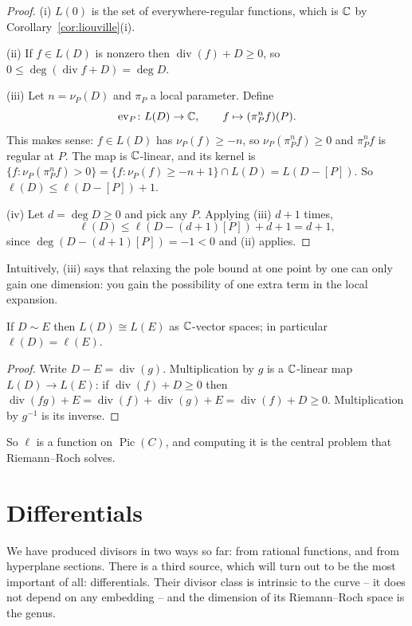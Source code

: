 \documentclass[a4paper]{scrartcl}
\DeclareMathOperator{\Divv}{div}
\DeclareMathOperator{\Pic}{Pic}
\begin{document}
\begin{proof}
	(i) $L(0)$ is the set of everywhere-regular functions, which is $\mathbb{C}$ by Corollary~\ref{cor:liouville}(i).

	(ii) If $f \in L(D)$ is nonzero then $\Divv(f) + D \geq 0$, so $0 \leq \deg(\Divv f + D) = \deg D$.

	(iii) Let $n = \nu_P(D)$ and $\pi_P$ a local parameter. Define
	$$\mathrm{ev}_P \colon L(D) \to \mathbb{C}, \qquad f \mapsto (\pi_P^{n}f)(P).$$
	This makes sense: $f \in L(D)$ has $\nu_P(f)\geq -n$, so $\nu_P(\pi_P^nf)\geq 0$ and $\pi_P^nf$ is regular at $P$. The map is $\mathbb{C}$-linear, and its kernel is $\{f : \nu_P(\pi_P^nf) > 0\} = \{f : \nu_P(f) \geq -n+1\} \cap L(D) = L(D - [P])$. So $\ell(D) \leq \ell(D-[P]) + 1$.

	(iv) Let $d = \deg D \geq 0$ and pick any $P$. Applying (iii) $d+1$ times,
	$$\ell(D) \leq \ell(D - (d+1)[P]) + d + 1 = d+1,$$
	since $\deg(D - (d+1)[P]) = -1 < 0$ and (ii) applies.
\end{proof}

Intuitively, (iii) says that relaxing the pole bound at one point by one can only gain one dimension: you gain the possibility of one extra term in the local expansion.

\begin{proposition}\label{prop:Lsim}
	If $D \sim E$ then $L(D)\cong L(E)$ as $\mathbb{C}$-vector spaces; in particular $\ell(D) = \ell(E)$.
\end{proposition}

\begin{proof}
	Write $D - E = \Divv(g)$. Multiplication by $g$ is a $\mathbb{C}$-linear map $L(D)\to L(E)$: if $\Divv(f)+D\geq0$ then $\Divv(fg) + E = \Divv(f) + \Divv(g) + E = \Divv(f)+D \geq 0$. Multiplication by $g^{-1}$ is its inverse.
\end{proof}

So $\ell$ is a function on $\Pic(C)$, and computing it is the central problem that Riemann--Roch solves.

\section{Differentials}\label{ag-sec:differentials}

We have produced divisors in two ways so far: from rational functions, and from hyperplane sections. There is a third source, which will turn out to be the most important of all: differentials. Their divisor class is intrinsic to the curve -- it does not depend on any embedding -- and the dimension of its Riemann--Roch space is the genus.
\end{document}
